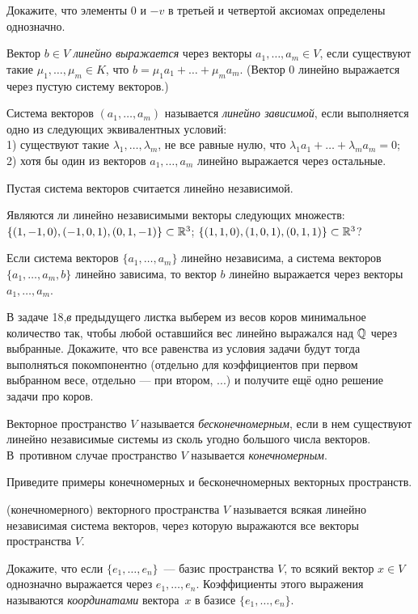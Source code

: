 \documentclass[a4paper,12pt]{article}
\begin{document}
 Докажите, что элементы $0$ и $-v$ в третьей и четвертой
аксиомах определены однозначно. 

 Вектор $b\in V$ {\it линейно выражается} через векторы
$a_1,\dots,a_m \in V$, если существуют такие $\mu_1,\dots,\mu_m\in
K$, что $b = \mu_1 a_1 + \dots + \mu_m a_m$. (Вектор $0$ линейно
выражается через пустую систему векторов.) 

 Система векторов $(a_1,\dots,a_m)$ называется {\it линейно
зависимой}, если выполняется одно из следующих эквивалентных
условий:\\
1) существуют такие $\lambda_1,\dots,\lambda_m$, не все равные нулю,
что $\lambda_1 a_1 + \dots + \lambda_m a_m = 0$;\\
2) хотя бы один из векторов $a_1,\dots,a_m$ линейно выражается через
остальные.

\noindent Пустая система векторов считается линейно независимой.


Являются ли линейно независимыми векторы следующих множеств:\\
 $\{(1, -1, 0), (-1, 0, 1), (0, 1, -1)\} \subset \mathbb{R}^3$;  $\{(1,1,0),(1,0,1),(0,1,1)\} \subset \mathbb{R}^3$?

 Если система векторов $\{a_1,\dots,a_m\}$ линейно
независима, а система векторов $\{a_1,\dots,a_m,b\}$ линейно
зависима, то вектор $b$ линейно выражается через векторы
$a_1,\dots,a_m$.

В задаче 18,{\em в} предыдущего листка выберем из весов коров минимальное количество так, чтобы любой оставшийся вес линейно выражался над $\mathbb{Q}$ через выбранные. Докажите, что все равенства из условия задачи будут тогда выполняться покомпонентно (отдельно для коэффициентов при первом выбранном весе, отдельно --- при втором, ...) и получите ещё одно решение задачи про коров.


 Векторное пространство $V$ называется {\it бесконечномерным},
если в нем существуют линейно независимые системы из сколь угодно
большого числа векторов. В~противном случае пространство $V$
называется {\it конечномерным}. 

 Приведите примеры конечномерных и бесконечномерных векторных пространств. 

 (конечномерного) векторного пространства $V$
называется всякая линейно независимая система векторов, через
которую выражаются все векторы пространства $V$. 

 Докажите, что если $\{e_1,\dots,e_n\}$~--- базис
пространства $V$, то всякий вектор $x\in V$ однозначно выражается
через $e_1,\dots,e_n$. Коэффициенты этого выражения называются {\it
координатами} вектора~$x$ в базисе $\{e_1,\dots,e_n\}$. 
\end{document}
